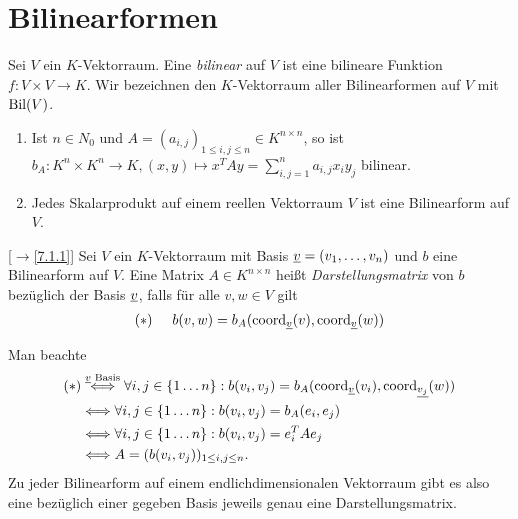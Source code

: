 \documentclass[../../main.tex]{subfiles}
\begin{document}
\section{Bilinearformen}

\begin{df}\label{13.3.1}
Sei $V$ ein $K$-Vektorraum. Eine \emph{bilinear} auf $V$ ist eine bilineare Funktion $f: V\times V\to K$. Wir bezeichnen den $K$-Vektorraum aller Bilinearformen auf $V$ mit $\operatorname{Bil}(V)$.
\end{df}

\begin{bsp}\label{13.3.2}
\begin{enumerate}[\normalfont(a)]
\item Ist $n\in N_0$ und $A=(a_{i,j})_{1\le i,j\le n}\in K^{n\times n}$, so ist $b_A: K^n\times K^n\to K, (x,y)\mapsto x^TAy=\sum_{i,j=1}^na_{i,j}x_iy_j$ bilinear.
\item Jedes Skalarprodukt auf einem reellen Vektorraum $V$ ist eine Bilinearform auf $V$.
\end{enumerate}
\end{bsp}
	
\begin{df}\label{13.3.3} 
[$\to$\ref{7.1.1}] Sei $V$ ein $K$-Vektorraum mit Basis ${\underline v}=(v_1,\ldots ,v_n)$ und $b$ eine Bilinearform auf $V$. Eine Matrix $A\in K^{n\times n}$ heißt \emph{Darstellungsmatrix} von $b$ bezüglich der Basis ${\underline v}$, falls für alle $v,w\in V$ gilt
\begin{align*}
	(*)\hspace{0.5cm} b(v,w)=b_A(\operatorname{coord}_{{\underline v}}(v),\operatorname{coord}_{{\underline v}}(w))
\end{align*}
\end{df}

\begin{bem}\label{13.3.4} 
Man beachte
\begin{align*}
(*)&\stackrel{\underline{v}\text{ Basis}}{\Longleftrightarrow} \forall i,j\in \{1\ldots n\}: b(v_i,v_j)=b_A(\operatorname{coord}_{\underline{v}}(v_i),\operatorname{coord}_{\underline{v_j}}(w))\\
&\Longleftrightarrow \forall i,j\in \{1\ldots n\}: b(v_i,v_j)=b_A(e_i,e_j)\\
&\Longleftrightarrow \forall i,j\in \{1\ldots n\}: b(v_i,v_j)=e_i^TAe_j\\
&\Longleftrightarrow A=(b(v_i,v_j))_{1\le i,j\le n}.
\end{align*}
Zu jeder Bilinearform auf einem endlichdimensionalen Vektorraum gibt es also eine bezüglich einer gegeben Basis jeweils genau eine Darstellungsmatrix.
\end{bem}
	
\end{document}
